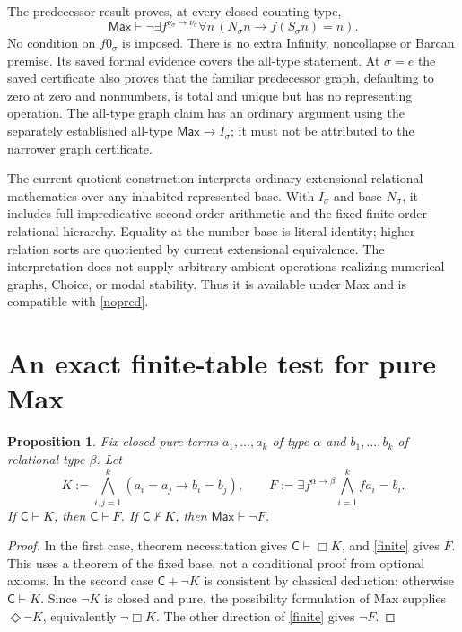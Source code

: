 \documentclass[11pt]{article}
\newcommand{\C}{\mathsf C}
\newcommand{\Max}{\mathsf{Max}}
\newtheorem{proposition}{Proposition}
\begin{document}
The predecessor result \cite{predecessor} proves, at every closed counting type,
\begin{equation}\label{nopred}
 \Max\vdash\neg\exists f^{\nu_\sigma\to\nu_\sigma}
       \forall n\,(N_\sigma n\to f(S_\sigma n)=n).
\end{equation}
No condition on $f0_\sigma$ is imposed. There is no extra Infinity, noncollapse or Barcan premise. Its saved formal evidence covers the all-type statement. At $\sigma=e$ the saved certificate also proves that the familiar predecessor graph, defaulting to zero at zero and nonnumbers, is total and unique but has no representing operation. The all-type graph claim has an ordinary argument using the separately established all-type $\Max\to I_\sigma$; it must not be attributed to the narrower graph certificate.

The current quotient construction \cite[\S29]{coding} interprets ordinary extensional relational mathematics over any inhabited represented base. With $I_\sigma$ and base $N_\sigma$, it includes full impredicative second-order arithmetic and the fixed finite-order relational hierarchy. Equality at the number base is literal identity; higher relation sorts are quotiented by current extensional equivalence. The interpretation does not supply arbitrary ambient operations realizing numerical graphs, Choice, or modal stability. Thus it is available under Max and is compatible with \eqref{nopred}.

\section{An exact finite-table test for pure Max}

\begin{proposition}\label{maxtable}
Fix closed pure terms $a_1,\ldots,a_k$ of type $\alpha$ and $b_1,\ldots,b_k$ of relational type $\beta$. Let
\[
 K:=\bigwedge_{i,j=1}^{k}(a_i=a_j\to b_i=b_j),\qquad
 F:=\exists f^{\alpha\to\beta}\bigwedge_{i=1}^{k}fa_i=b_i.
\]
If $\C\vdash K$, then $\C\vdash F$. If $\C\nvdash K$, then $\Max\vdash\neg F$.
\end{proposition}
\begin{proof}
In the first case, theorem necessitation gives $\C\vdash\Box K$, and \eqref{finite} gives $F$. This uses a theorem of the fixed base, not a conditional proof from optional axioms. In the second case $\C+\neg K$ is consistent by classical deduction: otherwise $\C\vdash K$. Since $\neg K$ is closed and pure, the possibility formulation of Max supplies $\Diamond\neg K$, equivalently $\neg\Box K$. The other direction of \eqref{finite} gives $\neg F$.
\end{proof}
\end{document}
